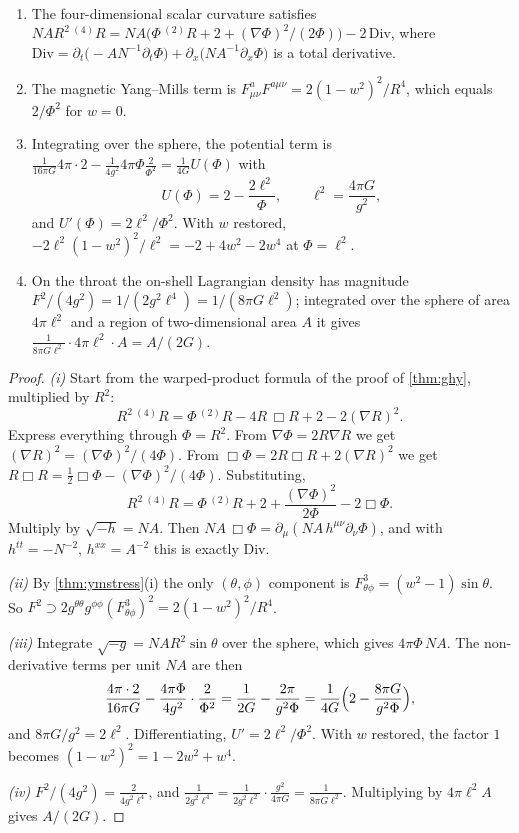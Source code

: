 \begin{theorem}\label{thm:dilatongravity}\ver\
\begin{enumerate}[label=(\roman*)]
\item The four-dimensional scalar curvature satisfies $NAR^2\,{}^{(4)}\!R=NA\bigl(\Phi\,{}^{(2)}\!R+2+(\nabla\Phi)^2/(2\Phi)\bigr)-2\,\mathrm{Div}$, where $\mathrm{Div}=\partial_t\bigl(-AN^{-1}\partial_t\Phi\bigr)+\partial_x\bigl(NA^{-1}\partial_x\Phi\bigr)$ is a total derivative.
\item The magnetic Yang--Mills term is $F^a_{\mu\nu}F^{a\mu\nu}=2(1-w^2)^2/R^4$, which equals $2/\Phi^2$ for $w=0$.
\item Integrating over the sphere, the potential term is $\frac1{16\pi G}4\pi\cdot2-\frac1{4g^2}4\pi\Phi\frac2{\Phi^2}=\frac1{4G}U(\Phi)$ with
\[
U(\Phi)=2-\frac{2\ell^2}\Phi,\qquad \ell^2=\frac{4\pi G}{g^2},
\]
and $U'(\Phi)=2\ell^2/\Phi^2$. With $w$ restored, $-2\ell^2(1-w^2)^2/\ell^2=-2+4w^2-2w^4$ at $\Phi=\ell^2$.
\item On the throat the on-shell Lagrangian density has magnitude $F^2/(4g^2)=1/(2g^2\ell^4)=1/(8\pi G\ell^2)$; integrated over the sphere of area $4\pi\ell^2$ and a region of two-dimensional area $A$ it gives $\frac1{8\pi G\ell^2}\cdot4\pi\ell^2\cdot A=A/(2G)$.
\end{enumerate}
\end{theorem}
\begin{proof}
\emph{(i)} Start from the warped-product formula of the proof of \cref{thm:ghy}, multiplied by $R^2$:
\[
R^2\,{}^{(4)}\!R=\Phi\,{}^{(2)}\!R-4R\,\Box R+2-2(\nabla R)^2 .
\]
Express everything through $\Phi=R^2$. From $\nabla\Phi=2R\nabla R$ we get $(\nabla R)^2=(\nabla\Phi)^2/(4\Phi)$. From $\Box\Phi=2R\Box R+2(\nabla R)^2$ we get $R\Box R=\frac12\Box\Phi-(\nabla\Phi)^2/(4\Phi)$. Substituting,
\[
R^2\,{}^{(4)}\!R=\Phi\,{}^{(2)}\!R+2+\frac{(\nabla\Phi)^2}{2\Phi}-2\Box\Phi .
\]
Multiply by $\sqrt{-h}=NA$. Then $NA\,\Box\Phi=\partial_\mu(NA\,h^{\mu\nu}\partial_\nu\Phi)$, and with $h^{tt}=-N^{-2}$, $h^{xx}=A^{-2}$ this is exactly $\mathrm{Div}$.

\emph{(ii)} By \cref{thm:ymstress}(i) the only $(\theta,\phi)$ component is $F^3_{\theta\phi}=(w^2-1)\sin\theta$. So $F^2\supset2g^{\theta\theta}g^{\phi\phi}(F^3_{\theta\phi})^2=2(1-w^2)^2/R^4$.

\emph{(iii)} Integrate $\sqrt{-g}=NAR^2\sin\theta$ over the sphere, which gives $4\pi\Phi\,NA$. The non-derivative terms per unit $NA$ are then
\[
\frac{4\pi\cdot2}{16\pi G}-\frac{4\pi\Phi}{4g^2}\cdot\frac2{\Phi^2}=\frac1{2G}-\frac{2\pi}{g^2\Phi}=\frac1{4G}\Bigl(2-\frac{8\pi G}{g^2\Phi}\Bigr),
\]
and $8\pi G/g^2=2\ell^2$. Differentiating, $U'=2\ell^2/\Phi^2$. With $w$ restored, the factor $1$ becomes $(1-w^2)^2=1-2w^2+w^4$.

\emph{(iv)} $F^2/(4g^2)=\frac2{4g^2\ell^4}$, and $\frac1{2g^2\ell^4}=\frac1{2g^2\ell^2}\cdot\frac{g^2}{4\pi G}=\frac1{8\pi G\ell^2}$. Multiplying by $4\pi\ell^2A$ gives $A/(2G)$.
\end{proof}


